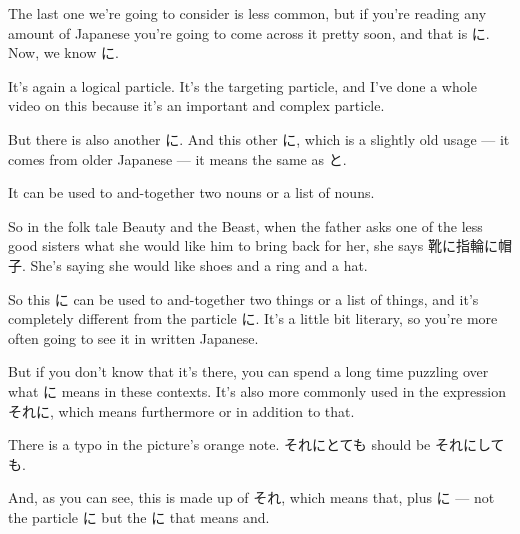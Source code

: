 \stopsectionlevel

\startsectionlevel[title={に that works as と},reference={に-that-works-as-と}]

The last one we're going to consider is less common, but if you're reading any amount of Japanese you're going to come across it pretty soon, and that is に. Now, we know に.

It's again a logical particle. It's the targeting particle, and I've done a whole video on this because it's an important and complex particle.

But there is also another に. And this other に, which is a slightly old usage --- it comes from older Japanese --- it means the same as と.

It can be used to and-together two nouns or a list of nouns.

{}

So in the folk tale Beauty and the Beast, when the father asks one of the less good sisters what she would like him to bring back for her, she says 靴に指輪に帽子. She's saying she would like shoes and a ring and a hat.

So this に can be used to and-together two things or a list of things, and it's completely different from the particle に. It's a little bit literary, so you're more often going to see it in written Japanese.

But if you don't know that it's there, you can spend a long time puzzling over what に means in these contexts. It's also more commonly used in the expression それに, which means furthermore or in addition to that.

{}

There is a typo in the picture's orange note. それにとても should be それにしても.

{}

And, as you can see, this is made up of それ, which means that, plus に --- not the particle に but the に that means and.

\stopsectionlevel

\stopsectionlevel
